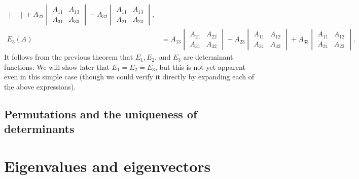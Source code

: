 \documentclass[12pt,letterpaper,reqno]{article}
\numberwithin{equation}{section}
\newcommand{\fixme}[1]{{\color{orange}{[#1]}}}
\begin{document}
\begin{example}
\begin{align*}
\begin{vmatrix}
	\end{vmatrix}+A_{22}\begin{vmatrix}
		A_{11} & A_{13} \\ A_{31} & A_{33}
	\end{vmatrix} - A_{32}\begin{vmatrix}
		A_{11} & A_{13} \\ A_{21} & A_{23}
	\end{vmatrix}, \\
	E_3(A) &= A_{13}\begin{vmatrix}
		A_{21} & A_{22} \\ A_{31} & A_{32}
	\end{vmatrix} - A_{23} \begin{vmatrix}
		A_{11} & A_{12} \\ A_{31} & A_{32}
	\end{vmatrix} + A_{33}\begin{vmatrix}
		A_{11} & A_{12} \\ A_{21} & A_{22}
	\end{vmatrix}.
\end{align*}
It follows from the previous theorem that $E_1, E_2$, and $E_3$ are determinant functions. We will show later that $E_1=E_2=E_3$, but this is not yet apparent even in this simple case (though we could verify it directly by expanding each of the above expressions).
\end{example}

\fixme{Add exercises here?}

\subsection{Permutations and the uniqueness of determinants}




\section{Eigenvalues and eigenvectors}

\printbibliography
\nocite{*}
\end{document}
